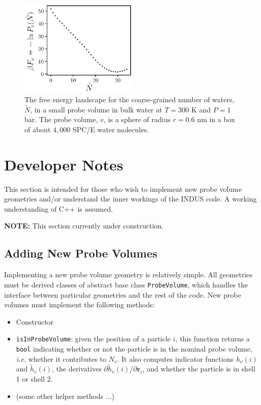\documentclass[11pt,notitlepage]{article}
\begin{document}

\begin{figure}
	\label{fig:fvn_bulk}
	\centering
	\includegraphics[width=0.5\textwidth]{examples/bulk_water/plot_F_v_Ntilde_WHAM.eps}
	\captionsetup{width=0.8\linewidth}
	\caption{\label{fig:fvn_bulk}The free energy landscape for the coarse-grained number of waters, $\tilde{N}$, in a small probe volume in bulk water at $T = 300$ K and $P = 1$ bar. The probe volume, $v$, is a sphere of radius $r = 0.6$ nm in a box of about $4,000$ SPC/E water molecules.}
\end{figure}



\section{Developer Notes}

This section is intended for those who wish to implement new probe volume geometries and/or understand the inner workings of the INDUS code. A working understanding of C++ is assumed. 

\textbf{NOTE:} This section currently under construction.


\subsection{Adding New Probe Volumes}

Implementing a new probe volume geometry is relatively simple. All geometries must be derived classes of abstract base class \texttt{ProbeVolume}, which handles the interface between particular geometries and the rest of the code. New probe volumes must implement the following methods:

\begin{itemize}
	\item Constructor
	\item \texttt{isInProbeVolume}: given the position of a particle $i$, this function returns a \texttt{bool} indicating whether or not the particle is in the nominal probe volume, \emph{i.e.} whether it contributes to $N_v$. It also computes indicator functions $h_v(i)$ and $\tilde{h}_v(i)$, the derivatives $\partial \tilde{h}_v(i) / \partial \mathbf{r}_i$, and whether the particle is in shell 1 or shell 2.
	\item (some other helper methods ...)
\end{itemize}
\end{document}
